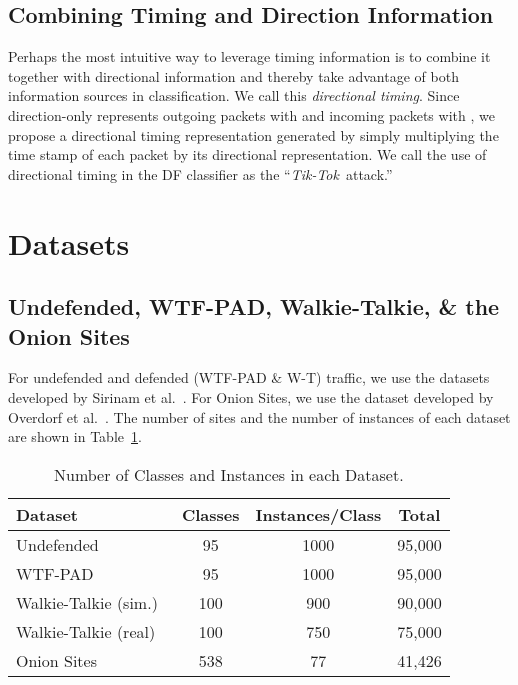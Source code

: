 \documentclass[USenglish,oneside,twocolumn]{article}
\newcommand{\attack}{{\em Tik-Tok}}
\begin{document}
\subsection{Combining Timing and Direction Information}
\label{tik_tok_td}



Perhaps the most intuitive way to leverage timing information is to combine it together with directional information and thereby take advantage of both information sources in classification. We call this \emph{directional timing}. Since direction-only represents outgoing packets with  and incoming packets with , we propose a directional timing representation generated by simply multiplying the time stamp of each packet by its directional representation. We call the use of directional timing in the DF classifier as the ``\attack~attack.''


 
\section{Datasets}

\subsection{Undefended, WTF-PAD, Walkie-Talkie, \& the Onion Sites}

For undefended and defended (WTF-PAD \& W-T) traffic, we use the datasets developed by Sirinam et al.~\cite{Sirinam2018}. For Onion Sites, we use the dataset developed by Overdorf et al.~\cite{overdorf2017unique}. The number of sites and the number of instances of each dataset are shown in Table~\ref{tab:datasets}. 

\begin{table}[h]
\renewcommand{\arraystretch}{1.15}
  \begin{center}\vskip -0.5cm
    \caption{Number of Classes and Instances in each Dataset.}\vskip -0.2cm
    \label{tab:datasets}
    \begin{tabular}{l c  c c}
\textbf{Dataset} & \textbf{Classes}& \textbf{Instances/Class} & \textbf{Total}\\
\hline Undefended~\cite{Sirinam2018} & 95 & 1000 & 95,000 \\
WTF-PAD~\cite{Sirinam2018} & 95 &  1000 & 95,000 \\
Walkie-Talkie (sim.)~\cite{Sirinam2018} & 100 &  900 & 90,000 \\
        Walkie-Talkie (real) & 100 & 750 & 75,000 \\
       Onion Sites~\cite{overdorf2017unique} & 538 & 77 & 41,426 \\
       \hline \end{tabular}\vskip -1.2cm
  \end{center} 
\end{table} 
\end{document}
